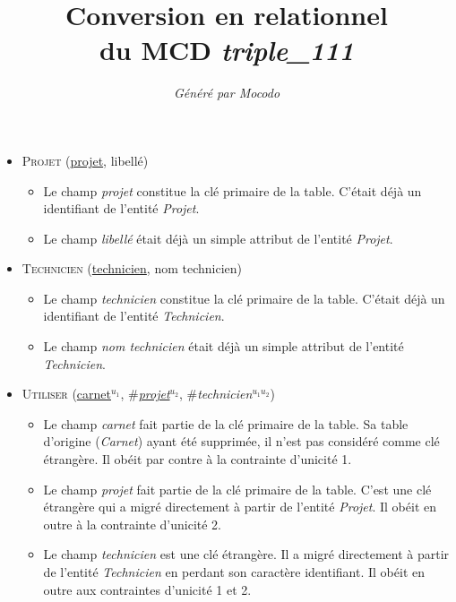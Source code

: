 \documentclass[a4paper]{article}
\title{Conversion en relationnel\\du MCD \emph{triple_111}}
\author{\emph{Généré par Mocodo}}
\newcommand{\relat}[1]{\textsc{#1}}
\newcommand{\attr}[1]{#1}
\newcommand{\prim}[1]{\uline{#1}}
\newcommand{\foreign}[1]{\#\textsl{#1}}
\begin{document}
\maketitle

\begin{itemize}
  \item \relat{Projet} (\prim{projet}, \attr{libellé})
  \begin{itemize}
    \item Le champ \emph{projet} constitue la clé primaire de la table. C'était déjà un identifiant de l'entité \emph{Projet}.
    \item Le champ \emph{libellé} était déjà un simple attribut de l'entité \emph{Projet}.
  \end{itemize}

  \item \relat{Technicien} (\prim{technicien}, \attr{nom technicien})
  \begin{itemize}
    \item Le champ \emph{technicien} constitue la clé primaire de la table. C'était déjà un identifiant de l'entité \emph{Technicien}.
    \item Le champ \emph{nom technicien} était déjà un simple attribut de l'entité \emph{Technicien}.
  \end{itemize}

  \item \relat{Utiliser} (\prim{carnet}$^{u_1}$, \foreign{\prim{projet}}$^{u_2}$, \foreign{technicien}$^{u_1 u_2}$)
  \begin{itemize}
    \item Le champ \emph{carnet} fait partie de la clé primaire de la table. Sa table d'origine (\emph{Carnet}) ayant été supprimée, il n'est pas considéré comme clé étrangère. Il obéit par contre à la contrainte d'unicité 1.
    \item Le champ \emph{projet} fait partie de la clé primaire de la table. C'est une clé étrangère qui a migré directement à partir de l'entité \emph{Projet}. Il obéit en outre à la contrainte d'unicité 2.
    \item Le champ \emph{technicien} est une clé étrangère. Il a migré directement à partir de l'entité \emph{Technicien} en perdant son caractère identifiant. Il obéit en outre aux contraintes d'unicité 1 et 2.
  \end{itemize}

\end{itemize}
\end{document}
